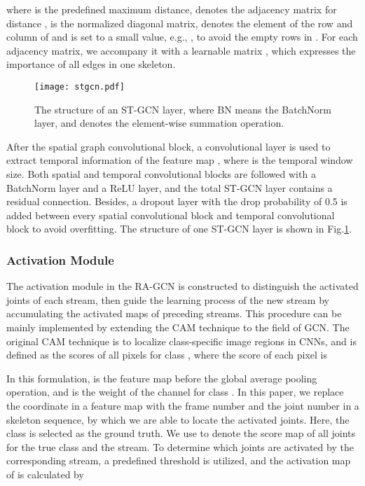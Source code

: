 \documentclass[journal]{IEEEtran}
\begin{document}
where  is the predefined maximum distance,  denotes the adjacency matrix for distance ,  is the normalized diagonal matrix,  denotes the element of the  row and  column of  and  is set to a small value, e.g., , to avoid the empty rows in . For each adjacency matrix, we accompany it with a learnable matrix , which expresses the importance of all edges in one skeleton.

\begin{figure}[t]
    \centering
    \texttt{[image: stgcn.pdf]}
    \caption{The structure of an ST-GCN layer, where BN means the BatchNorm layer, and  denotes the element-wise summation operation.}
    \label{fig:stgcn}
\end{figure}

After the spatial graph convolutional block, a  convolutional layer is used to extract temporal information of the feature map , where  is the temporal window size. Both spatial and temporal convolutional blocks are followed with a BatchNorm layer and a ReLU layer, and the total ST-GCN layer contains a residual connection. Besides, a dropout layer with the drop probability of 0.5 is added between every spatial convolutional block and temporal convolutional block to avoid overfitting. The structure of one ST-GCN layer is shown in Fig.\ref{fig:stgcn}.

\subsubsection{Activation Module}
\label{sssec:activation}

The activation module in the RA-GCN is constructed to distinguish the activated joints of each stream, then guide the learning process of the new stream by accumulating the activated maps of preceding streams. This procedure can be mainly implemented by extending the CAM technique \cite{zhou2016learning} to the field of GCN. The original CAM technique is to localize class-specific image regions in CNNs, and  is defined as the scores of all pixels for class , where the score of each pixel is

In this formulation,  is the feature map before the global average pooling operation, and  is the weight of the  channel for class . In this paper, we replace the coordinate  in a feature map with the frame number  and the joint number  in a skeleton sequence, by which we are able to locate the activated joints. Here, the class  is selected as the ground truth. We use  to denote the score map of all joints for the true class and the  stream. To determine which joints are activated by the corresponding stream, a predefined threshold  is utilized, and the activation map of  is calculated by
\end{document}
